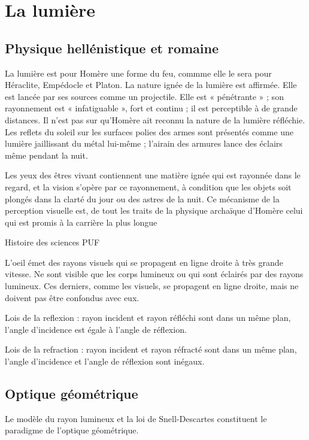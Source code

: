 
\section{La lumière}

\subsection{Physique hellénistique et romaine}

\vspace{0.24cm}
{\footnotesize
La lumière est pour Homère une forme du feu, commme elle le sera pour Héraclite, Empédocle et Platon. La nature ignée de la lumière est affirmée. Elle est lancée par ses sources comme un projectile. Elle est « pénétrante » ; son rayonnement est « infatiguable », fort et continu ; il est perceptible à de grande distances. Il n'est pas sur qu'Homère ait reconnu la nature de la lumière réfléchie. Les reflets du soleil sur les surfaces polies des armes sont présentés comme une lumière jaillissant du métal lui-même ; l'airain des armures lance des éclairs même pendant la nuit.

Les yeux des êtres vivant contiennent une matière ignée qui est rayonnée dans le regard, et la vision s'opère par ce rayonnement, à condition que les objets soit plongés dans la clarté du jour ou des astres de la nuit. Ce mécanisme de la perception visuelle est, de tout les traits de la physique archaïque d'Homère celui qui est promis à la carrière la plus longue

\begin{flushright}
Histoire des sciences PUF
\end{flushright}
 }
\vspace{0.31cm}

L'oeil émet des rayons visuels qui se propagent en ligne droite à très grande vitesse. Ne sont visible que les corps lumineux ou qui sont éclairés par des rayons lumineux. Ces derniers, comme les visuels, se propagent en ligne droite, mais ne doivent pas être confondus avec eux.

Lois de la reflexion : rayon incident et rayon réfléchi sont dans un même plan, l'angle d'incidence est égale à l'angle de réflexion.

Lois de la refraction : rayon incident et rayon réfracté sont dans un même plan, l'angle d'incidence et l'angle de réflexion sont inégaux. 

\subsection{Optique géométrique}
Le modèle du rayon lumineux et la loi de Snell-Descartes constituent le paradigme de l'optique géométrique.

